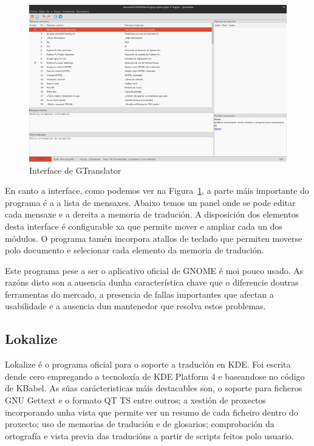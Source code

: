 \begin{figure}[h]
    \centering
    \includegraphics[width=\textwidth]{img/captura_gtranslator.png}
    \caption[Interface de GTranslator]{Interface de GTranslator}
    \label{fig:gtranslator}
\end{figure}

En canto a interface, como podemos ver na Figura~\ref{fig:gtranslator}, a parte máis importante do programa é a a lista de mensaxes. Abaixo temos un panel onde se pode editar cada mensaxe e a dereita a memoria de tradución. A disposición dos elementos desta interface é configurable xa que permite mover e ampliar cada un dos módulos. O programa tamén incorpora atallos de teclado que permiten moverse polo documento e selecionar cada elemento da memoria de tradución.

Este programa pese a ser o aplicativo oficial de GNOME é moi pouco usado. As razóns disto son a ausencia dunha característica chave que o diferencie doutras ferramentas do mercado, a presencia de fallas importantes que afectan a usabilidade e a ausencia dun mantenedor que resolva estos problemas.

\subsection{Lokalize}
Lokalize é o programa oficial para o soporte a tradución en KDE. Foi escrita dende cero empregando a tecnoloxía de KDE Platform 4 e baseandose no código de KBabel. As súas carácteristicas máis destacables son, o soporte para ficheros GNU Gettext e o formato QT TS entre outros; a xestión de proxectos incorporando unha vista que permite ver un resumo de cada ficheiro dentro do proxecto; uso de memorias de tradución e de glosarios; comprobación da ortografía e vista previa das traducións a partir de scripts feitos polo usuario.

